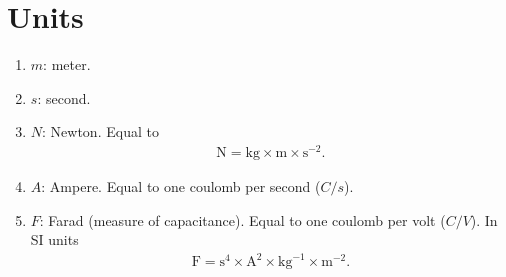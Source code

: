 \documentclass[12pt]{report}
\begin{document}
\section{Units}
\begin{enumerate}
    \item $m$: meter. 
    \item $s$: second. 
    \item $N$: Newton.
        Equal to 
        \begin{align}
            \mathrm{N}
            =
            \mathrm{kg} \times \mathrm{m} \times \mathrm{s}^{-2}
            .
        \end{align}
    \item $A$: Ampere. Equal to one coulomb per second ($C/s$).
    \item $F$: Farad (measure of capacitance). Equal to one coulomb per volt ($C/V$).
        In SI units
        \begin{align}
            \mathrm{F} = \mathrm{s}^4\times \mathrm{A}^2 \times \mathrm{kg}^{-1} \times \mathrm{m}^{-2}
            .
        \end{align}
\end{enumerate}


\end{document}
